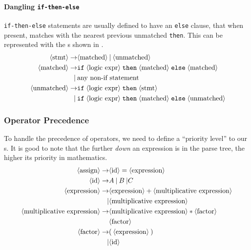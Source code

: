 \paragraph{Dangling \texttt{if-then-else}}\label{par:Dangling_if-else}
\texttt{if-then-else} statements are usually defined to have an \texttt{else} clause, that when present, matches with the nearest previous unmatched \texttt{then}.
This can be represented with the s shown in .
\begin{equation}\label{eq:Dangling_if-else}
  \begin{aligned}
    \langle \text{stmt} \rangle \rightarrow &\langle \text{matched} \rangle \: \vert \: \langle \text{unmatched} \rangle \\
    \langle \text{matched} \rangle \rightarrow &\mathtt{if} \; \langle \text{logic expr} \rangle \; \mathtt{then} \; \langle \text{matched} \rangle \; \mathtt{else} \; \langle \text{matched} \rangle \\
    \vert \: &\text{any non-if statement} \\\
    \langle \text{unmatched} \rangle \rightarrow &\mathtt{if} \; \langle \text{logic expr} \rangle \; \mathtt{then} \; \langle \text{stmt} \rangle \\
    \vert \: &\mathtt{if} \; \langle \text{logic expr} \rangle \; \mathtt{then} \; \langle \text{matched} \rangle \; \mathtt{else} \; \langle \text{unmatched} \rangle
  \end{aligned}
\end{equation}

\subsubsection{Operator Precedence}\label{subsubsec:Operator_Precedence}
To handle the precedence of operators, we need to define a ``priority level'' to our s.
It is good to note that the further \emph{down} an expression is in the parse tree, the higher its priority in mathematics.
\begin{equation}\label{eq:Operator_Precedence}
  \begin{aligned}
    \langle \text{assign} \rangle \rightarrow &\langle \text{id} \rangle = \langle \text{expression} \rangle \\
    \langle \text{id} \rangle \rightarrow &A \: \vert \: B \: \vert C \\
    \langle \text{expression} \rangle \rightarrow &\langle \text{expression} \rangle + \langle \text{multiplicative expression} \rangle \\
    \vert &\langle \text{multiplicative expression} \rangle \\
    \langle \text{multiplicative expression} \rangle \rightarrow &\langle \text{multiplicative expression} \rangle * \langle \text{factor} \rangle \\
    &\langle \text{factor} \rangle \\
    \langle \text{factor} \rangle \rightarrow &( \: \langle \text{expression} \rangle \: ) \\
    \vert &\langle \text{id} \rangle \\
  \end{aligned}
\end{equation}

